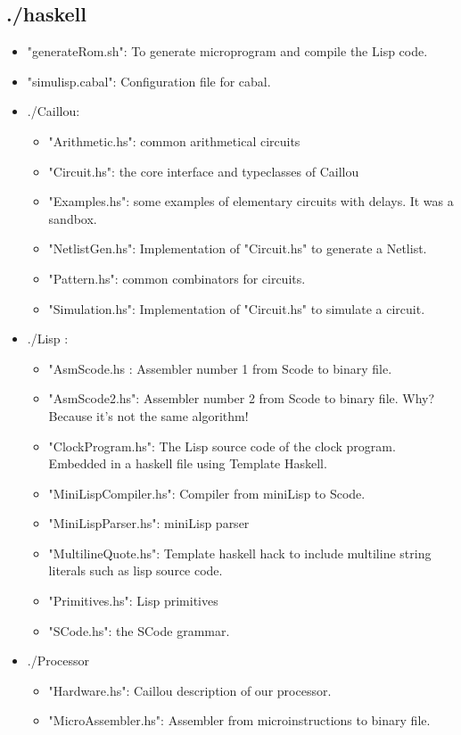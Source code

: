 \documentclass[a4paper, 11pt]{article}
\begin{document}
\subsection{./haskell}
\begin{itemize}
\item "generateRom.sh": To generate microprogram and compile the Lisp code.
\item "simulisp.cabal": Configuration file for cabal.
\item ./Caillou:
\begin{itemize}
\item "Arithmetic.hs":  common arithmetical circuits
\item "Circuit.hs": the core interface and typeclasses of Caillou
\item "Examples.hs": some examples of elementary circuits with delays. It was a sandbox.
\item "NetlistGen.hs": Implementation of "Circuit.hs" to generate a Netlist.
\item "Pattern.hs": common combinators for circuits.
\item "Simulation.hs": Implementation of "Circuit.hs" to simulate a circuit.
\end{itemize}
\item ./Lisp : 
\begin{itemize}
\item "AsmScode.hs : Assembler number 1 from Scode to binary file.
\item "AsmScode2.hs": Assembler number 2 from Scode to binary file. Why? Because
it's not the same algorithm!
\item "ClockProgram.hs": The Lisp source code of the clock program. Embedded in
a haskell file using Template Haskell.
\item "MiniLispCompiler.hs": Compiler from miniLisp to Scode.
\item "MiniLispParser.hs": miniLisp parser
\item "MultilineQuote.hs": Template haskell hack to include multiline string
literals such as lisp source code.
\item "Primitives.hs": Lisp primitives
\item "SCode.hs": the SCode grammar.  
\end{itemize}
\item ./Processor 
\begin{itemize}
\item "Hardware.hs": Caillou description of our processor. 
\item "MicroAssembler.hs": Assembler from microinstructions to binary file.

\end{itemize}
\end{itemize}
\end{document}
